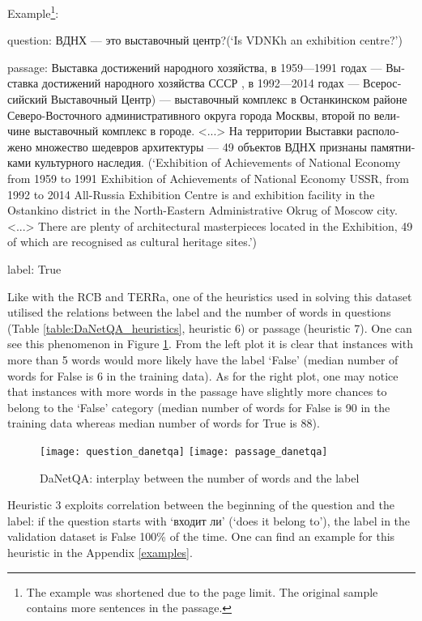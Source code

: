 \documentclass[11pt]{article}
\begin{document}
\begin{flushleft}
Example\footnote{The example was shortened due to the page limit. The original sample contains more sentences in the passage.}:

question: \foreignlanguage{russian}{ВДНХ --- это выставочный центр?}(`Is VDNKh an exhibition centre?')

passage: \foreignlanguage{russian}{Выставка достижений народного хозяйства, в 1959—1991 годах — Выставка достижений народного хозяйства СССР , в 1992—2014 годах — Всероссийский Выставочный Центр) — выставочный комплекс в Останкинском районе Северо-Восточного административного округа города Москвы, второй по величине выставочный комплекс в городе.  <...> На территории Выставки расположено множество шедевров архитектуры — 49 объектов ВДНХ признаны памятниками культурного наследия.} (`Exhibition of Achievements of National Economy from 1959 to 1991 Exhibition of Achievements of National Economy USSR, from 1992 to 2014 All-Russia Exhibition Centre is and exhibition facility in the Ostankino district in the North-Eastern Administrative Okrug of Moscow city. <...> There are plenty of architectural masterpieces located in the Exhibition, 49 of which are recognised as cultural heritage sites.') 

label: True
\end{flushleft}

Like with the RCB and TERRa, one of the heuristics used in solving this dataset utilised the relations between the label and the number of words in questions (Table \ref{table:DaNetQA_heuristics}, heuristic 6) or passage (heuristic 7). 
One can see this phenomenon in Figure \ref{fig:DaNetQA_numberofwords}.
From the left plot it is clear that instances with more than 5 words  would more likely have the label `False' (median number of words for False is 6 in the training data). 
As for the right plot, one may notice that instances with more words in the passage have slightly more chances to belong to the `False' category (median number of words for False is 90 in the training data whereas median number of words for True is 88). 

\begin{figure}[t]
\texttt{[image: question\_danetqa]}
\texttt{[image: passage\_danetqa]}
\caption{DaNetQA: interplay between the number of words and the label}
\label{fig:DaNetQA_numberofwords}
\end{figure}
Heuristic 3 exploits correlation between the beginning of the question and the label: if the question starts with \foreignlanguage{russian}{`входит ли'} (`does it belong to'), the label in the validation dataset is False 100\% of the time. One can find an example for this heuristic in the Appendix \ref{examples}.
\end{document}

